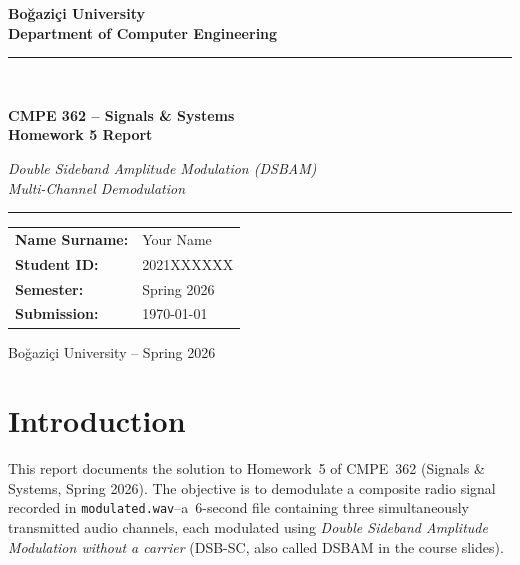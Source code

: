 \documentclass[12pt, a4paper]{article}
\begin{document}
\begin{titlepage}
    \centering
    \vspace*{2cm}
    {\LARGE\bfseries Boğaziçi University\\[0.4em]
    Department of Computer Engineering\par}
    \vspace{1.5cm}
    \rule{\linewidth}{1pt}\\[0.5em]
    {\huge\bfseries CMPE 362 -- Signals \& Systems\\[0.4em]
    Homework 5 Report\par}
    {\large\itshape Double Sideband Amplitude Modulation (DSBAM)\\
    Multi-Channel Demodulation\par}
    \rule{\linewidth}{1pt}
    \vspace{1.5cm}

    \begin{tabular}{ll}
        \textbf{Name Surname:}  & Your Name \\[4pt]
        \textbf{Student ID:}    & 2021XXXXXX \\[4pt]
        \textbf{Semester:}      & Spring 2026 \\[4pt]
        \textbf{Submission:}    & \today \\
    \end{tabular}

    \vfill
    {\small Boğaziçi University -- Spring 2026}
\end{titlepage}

\tableofcontents
\newpage

\section{Introduction}

This report documents the solution to Homework~5 of CMPE~362 (Signals \& Systems,
Spring 2026). The objective is to demodulate a composite radio signal recorded in
\texttt{modulated.wav}--a~6-second file containing three simultaneously
transmitted audio channels, each modulated using \emph{Double Sideband Amplitude
Modulation without a carrier} (DSB-SC, also called DSBAM in the course slides).
\end{document}
